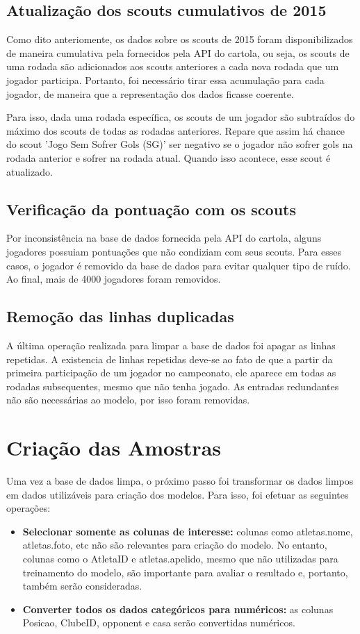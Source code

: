 \documentclass[conference]{IEEEtran}
\begin{document}
\subsection{Atualização dos scouts cumulativos de 2015}
Como dito anteriomente, os dados sobre os scouts de 2015 foram disponibilizados de maneira cumulativa pela fornecidos pela API do cartola, ou seja, os scouts de uma rodada são adicionados aos scouts anteriores a cada nova rodada que um jogador participa. Portanto, foi necessário tirar essa acumulação para cada jogador, de maneira que a representação dos dados ficasse coerente.

Para isso, dada uma rodada específica, os scouts de um jogador são subtraídos do máximo dos scouts de todas as rodadas anteriores. Repare que assim há chance do scout 'Jogo Sem Sofrer Gols (SG)' ser negativo se o jogador não sofrer gols na rodada anterior e sofrer na rodada atual. Quando isso acontece, esse scout é atualizado.


\subsection{Verificação da pontuação com os scouts}

Por inconsistência na base de dados fornecida pela API do cartola, alguns jogadores possuiam pontuações que não condiziam com seus scouts. Para esses casos, o jogador é removido da base de dados para evitar qualquer tipo de ruído.
Ao final, mais de 4000 jogadores foram removidos.

\subsection{Remoção das linhas duplicadas}

A última operação realizada para limpar a base de dados foi apagar as linhas repetidas. A existencia de linhas repetidas deve-se ao fato de que a partir da primeira participação de um jogador no campeonato, ele aparece em todas as rodadas subsequentes, mesmo que não tenha jogado. As entradas redundantes não são necessárias ao modelo, por isso foram removidas.


\section{Criação das Amostras}

Uma vez a base de dados limpa, o próximo passo foi transformar os dados limpos em dados utilizáveis para criação dos modelos. Para isso, foi efetuar as seguintes operações:
\begin{itemize}
	\item \textbf{Selecionar somente as colunas de interesse:} colunas como atletas.nome, atletas.foto, etc não são relevantes para criação do modelo. No entanto, colunas como o AtletaID e atletas.apelido, mesmo que não utilizadas para treinamento do modelo, são importante para avaliar o resultado e, portanto, também serão consideradas.

	\item \textbf{Converter todos os dados categóricos para numéricos:} as colunas Posicao, ClubeID, opponent e casa serão convertidas numéricos.
\end{itemize}
\end{document}

